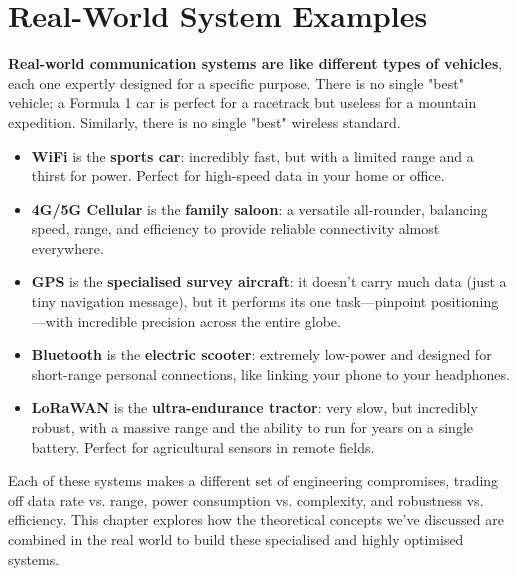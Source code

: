 
\chapter{Real-World System Examples}
\label{ch:real-world-systems}

\begin{nontechnical}
    \textbf{Real-world communication systems are like different types of vehicles}, each one expertly designed for a specific purpose. There is no single "best" vehicle; a Formula 1 car is perfect for a racetrack but useless for a mountain expedition. Similarly, there is no single "best" wireless standard.

    \begin{itemize}
        \item \textbf{WiFi} is the \textbf{sports car}: incredibly fast, but with a limited range and a thirst for power. Perfect for high-speed data in your home or office.
        \item \textbf{4G/5G Cellular} is the \textbf{family saloon}: a versatile all-rounder, balancing speed, range, and efficiency to provide reliable connectivity almost everywhere.
        \item \textbf{GPS} is the \textbf{specialised survey aircraft}: it doesn't carry much data (just a tiny navigation message), but it performs its one task—pinpoint positioning—with incredible precision across the entire globe.
        \item \textbf{Bluetooth} is the \textbf{electric scooter}: extremely low-power and designed for short-range personal connections, like linking your phone to your headphones.
        \item \textbf{LoRaWAN} is the \textbf{ultra-endurance tractor}: very slow, but incredibly robust, with a massive range and the ability to run for years on a single battery. Perfect for agricultural sensors in remote fields.
    \end{itemize}

    Each of these systems makes a different set of engineering compromises, trading off data rate vs. range, power consumption vs. complexity, and robustness vs. efficiency. This chapter explores how the theoretical concepts we've discussed are combined in the real world to build these specialised and highly optimised systems.
\end{nontechnical}


